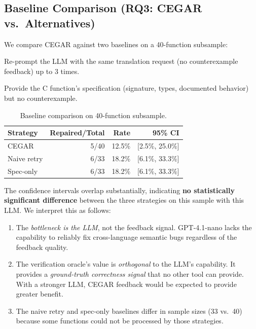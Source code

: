 \documentclass[10pt,letterpaper]{article}
\begin{document}
\subsection{Baseline Comparison (RQ3: CEGAR vs.\ Alternatives)}
\label{sec:baselines}

We compare CEGAR against two baselines on a 40-function subsample:

\begin{description}[itemsep=2pt]
\item[Naive retry:] Re-prompt the LLM with the same translation request
  (no counterexample feedback) up to 3 times.
\item[Spec-only:] Provide the C function's specification (signature, types,
  documented behavior) but no counterexample.
\end{description}

\begin{table}[t]
\centering
\caption{Baseline comparison on 40-function subsample.}
\label{tab:baselines}
\begin{tabular}{@{}lrrr@{}}
\toprule
\textbf{Strategy} & \textbf{Repaired/Total} & \textbf{Rate} & \textbf{95\% CI} \\
\midrule
CEGAR & 5/40 & 12.5\% & [2.5\%, 25.0\%] \\
Naive retry & 6/33 & 18.2\% & [6.1\%, 33.3\%] \\
Spec-only & 6/33 & 18.2\% & [6.1\%, 33.3\%] \\
\bottomrule
\end{tabular}
\end{table}

The confidence intervals overlap substantially, indicating \textbf{no statistically
significant difference} between the three strategies on this sample with this LLM.
We interpret this as follows:

\begin{enumerate}[itemsep=1pt]
\item The \emph{bottleneck is the LLM}, not the feedback signal. GPT-4.1-nano
  lacks the capability to reliably fix cross-language semantic bugs regardless of
  the feedback quality.
\item The verification oracle's value is \emph{orthogonal} to the LLM's capability.
  It provides a \emph{ground-truth correctness signal} that no other tool can provide.
  With a stronger LLM, CEGAR feedback would be expected to provide greater benefit.
\item The naive retry and spec-only baselines differ in sample sizes (33 vs.\ 40)
  because some functions could not be processed by those strategies.
\end{enumerate}
\end{document}
